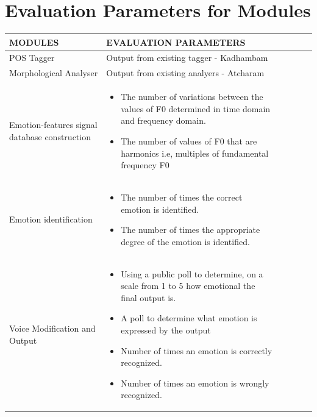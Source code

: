 \documentclass{article}
\begin{document}
\section{Evaluation Parameters for Modules}\large
\begin{center}
\begin{tabularx}{\linewidth}{|@{}lYYYYY@{}|}
\hline
MODULES & EVALUATION PARAMETERS \\ 
\hline\hline
	POS Tagger &  Output from existing tagger - Kadhambam\\
\hline
Morphological Analyser & Output from existing analyers - Atcharam\\
\hline
	Emotion-features signal database construction
& \begin{itemize}
\item The number of variations between the values of F0 determined in time domain and frequency domain.
\item The number of values of F0 that are harmonics i.e, multiples of fundamental frequency F0
\end{itemize}\\
\hline
	Emotion identification & 
\begin{itemize}
\item The number of times the correct emotion is identified.
\item The number of times the appropriate degree of the emotion is identified.
\end{itemize}\\
\hline
	Voice Modification and Output &
\begin{itemize}
\item Using a public poll to determine, on a scale from 1 to 5 how emotional the final output is.
\item A poll to determine what emotion is expressed by the output 
\item Number of times an emotion is correctly recognized. 
\item Number of times an emotion is wrongly recognized.
\end{itemize}
\end {tabularx}
\end{center}
\end{document}
